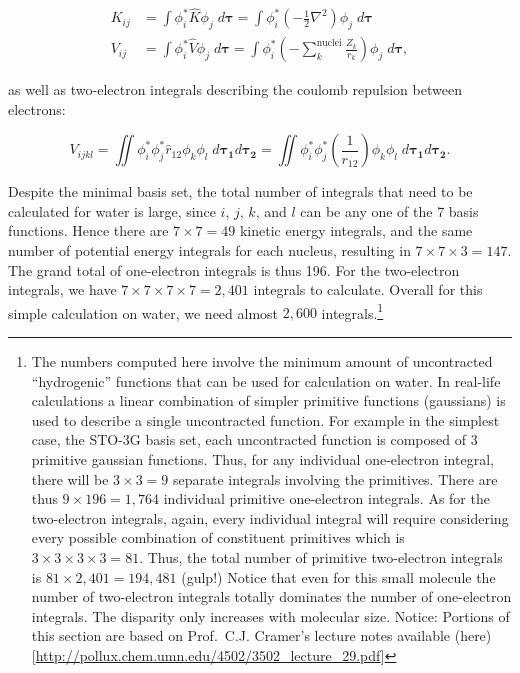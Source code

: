 \documentclass[
  9pt,
]{extbook}
\theoremstyle{definition}
\theoremstyle{definition}
\theoremstyle{definition}
\theoremstyle{remark}
\begin{document}
\begin{equation}
\begin{aligned}
\displaystyle K_{ij} &= \int \phi_i^* {\hat K} \phi_j\; d\mathbf{\tau}=\int \phi_i^* {\left(-\frac{1}{2}\nabla^2\right)} \phi_j\; d\mathbf{\tau} \\
\displaystyle V_{ij} &= \int \phi_i^* {\hat V} \phi_j\;d\mathbf{\tau} = \int \phi_i^* {\left(-\sum_k^{\mathrm{nuclei}}\frac{Z_k}{r_k}\right)} \phi_j\; d\mathbf{\tau} ,
\end{aligned}
\label{eq:oneelint}
\end{equation}

as well as two-electron integrals describing the coulomb repulsion between electrons:

\begin{equation}
V_{ijkl} = \iint \phi_i^* \phi_j^* {\hat r}_{12} \phi_k \phi_l\; d\mathbf{\tau_1}d\mathbf{\tau_2}=\iint \phi_i^* \phi_j^* \left(\frac{1}{r_{12}}\right) \phi_k \phi_l\; d\mathbf{\tau_1}d\mathbf{\tau_2}.
\label{eq:twoelint}
\end{equation}

Despite the minimal basis set, the total number of integrals that need to be calculated for water is large, since \(i\), \(j\), \(k\), and \(l\) can be any one of the 7 basis functions. Hence there are \(7\times7=49\) kinetic energy integrals, and the same number of potential energy integrals for each nucleus, resulting in \(7\times 7 \times 3 = 147\). The grand total of one-electron integrals is thus 196. For the two-electron integrals, we have \(7 \times 7 \times 7 \times 7 = 2{,}401\) integrals to calculate. Overall for this simple calculation on water, we need almost \(2{,}600\) integrals.\footnote{The numbers computed here involve the minimum amount of uncontracted ``hydrogenic'' functions that can be used for calculation on water. In real-life calculations a linear combination of simpler primitive functions (gaussians) is used to describe a single uncontracted function. For example in the simplest case, the STO-3G basis set, each uncontracted function is composed of 3 primitive gaussian functions. Thus, for any individual one-electron integral, there will be \(3 \times 3 = 9\) separate integrals involving the primitives. There are thus \(9 \times 196 = 1{,}764\) individual primitive one-electron integrals. As for the two-electron integrals, again, every individual integral will require considering every possible combination of constituent primitives which is \(3 \times 3 \times 3 \times 3 = 81\). Thus, the total number of primitive two-electron integrals is \(81 \times 2{,}401 = 194{,}481\) (gulp!) Notice that even for this small molecule the number of two-electron integrals totally dominates the number of one-electron integrals. The disparity only increases with molecular size. Notice: Portions of this section are based on Prof.~C.J. Cramer's lecture notes available (here){[}\url{http://pollux.chem.umn.edu/4502/3502_lecture_29.pdf}{]}}
\end{document}
